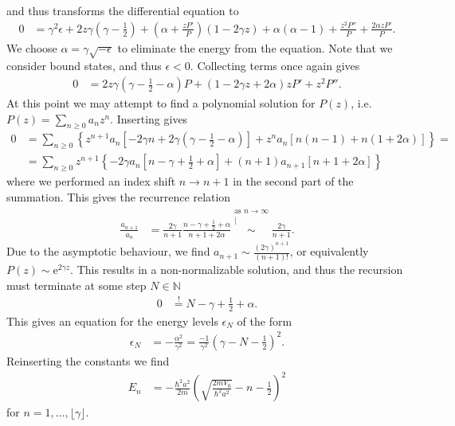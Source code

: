 \documentclass[english, parskip=full]{scrartcl}
\newcommand{\kom}{}
\newcommand{\kla}{}
\newcommand{\klam}{}
\newcommand{\klammer}{}
\newcommand{\e}{\text{e}}
\begin{document}
and thus transforms the differential equation to
\begin{align}
0 &= \gamma^2\epsilon + 2z\gamma \kla\left( \gamma - \frac{1}{2} \right) + \kla\left( \alpha + \frac{zP'}{P} \right) \kla\left( 1 - 2\gamma z \right) + \alpha(\alpha - 1) + \frac{z^2P''}{P} + \frac{2\alpha zP'}{P} .
\end{align}
We choose $\alpha = \gamma \sqrt{-\epsilon}$ to eliminate the energy from the equation. 
Note that we consider bound states, and thus $\epsilon < 0$.
Collecting terms once again gives
\begin{align}
0 &= 2z\gamma \kla\left( \gamma - \frac{1}{2} - \alpha \right) P + \kla\left( 1 - 2\gamma z + 2\alpha \right) zP' + z^2P''.
\end{align}
At this point we may attempt to find a polynomial solution for $P(z)$, i.e. $P(z) = \sum_{n\ge 0} a_nz^n$.
Inserting gives
\begin{align}
0 &= \sum_{n\ge 0} \klammer\left\{ z^{n+1} a_n\klam\left[ -2\gamma n + 2\gamma \kla\left( \gamma - \frac{1}{2} - \alpha \right) \right] + z^na_n \klam\left[ n(n-1) + n(1+2\alpha) \right] \right\} = \\
&= \sum_{n\ge 0} z^{n+1} \klammer\left\{ -2\gamma a_n \klam\left[ n - \gamma + \frac{1}{2} + \alpha \right] + (n+1)a_{n+1} \klam\left[ n + 1 + 2\alpha \right] \right\}
\end{align}
where we performed an index shift $n\rightarrow n+1$ in the second part of the summation.
This gives the recurrence relation
\begin{align}
\frac{a_{n+1}}{a_n} &= \frac{2\gamma}{n+1} \frac{n - \gamma + \frac{1}{2} + \alpha}{n+1 + 2\alpha} \kom\overset{\substack{\text{as }{n\rightarrow\infty} \\ |}}{\sim} \frac{2\gamma}{n+1}.
\end{align}
Due to the asymptotic behaviour, we find $a_{n+1} \sim \frac{(2\gamma)^{n+1}}{(n+1)!}$, or equivalently $P(z) \sim \e^{2\gamma z}$.
This results in a non-normalizable solution, and thus the recursion must terminate at some step $N\in\mathbb{N}$
\begin{align}
0 &\overset{!}{=} N - \gamma + \frac{1}{2} + \alpha.
\end{align}
This gives an equation for the energy levels $\epsilon_N$ of the form
\begin{align}
\epsilon_N &= -\frac{\alpha^2}{\gamma^2} = \frac{-1}{\gamma^2} \kla\left( \gamma - N - \frac{1}{2} \right)^2.
\end{align}
Reinserting the constants we find
\begin{align}
E_n &= -\frac{\hbar^2a^2}{2m} \kla\left( \sqrt{\frac{2mV_0}{\hbar^2a^2}} - n - \frac{1}{2} \right)^2
\end{align}
for $n=1,\dots, \lfloor \gamma \rfloor$.
\end{document}
